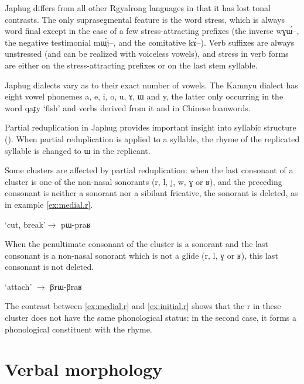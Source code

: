 \documentclass[oldfontcommands,oneside,a4paper,11pt]{article}
\newcommand{\ipa}[1]{{\phon#1}} %
\begin{document}
Japhug differs from all other Rgyalrong languages in that it has lost tonal contrasts. The only suprasegmental feature is the word stress, which is always word final except in the case of a few stress-attracting prefixes (the inverse \ipa{wɣɯ́--}, the negative testimonial \ipa{mɯ́j--}, and the comitative \ipa{kɤ́--}). Verb suffixes are always unstressed (and can be realized with voiceless vowels), and stress in verb forms are either on the stress-attracting prefixes or on the last stem syllable.

Japhug dialects vary as to their exact number of vowels. The Kamnyu dialect has eight vowel phonemes \ipa{a},  \ipa{e},  \ipa{i},  \ipa{o},  \ipa{u},   \ipa{ɤ},  \ipa{ɯ} and \ipa{y}, the latter only occurring in the word \ipa{qaɟy} `fish' and verbs derived from it and in Chinese loanwords. 

Partial reduplication in Japhug provides important insight into syllabic structure (\citealt{jacques07redupl}). When partial reduplication is applied to a syllable, the rhyme of the replicated syllable is changed to \ipa{ɯ} in the replicant.
 
Some clusters are affected by partial reduplication:   when the last consonant  of a cluster is one of the non-nasal sonorants (\ipa{r}, \ipa{l}, \ipa{j}, \ipa{w}, \ipa{ɣ} or \ipa{ʁ}), and the preceding consonant is neither a sonorant nor a sibilant fricative, the sonorant is deleted, as in example \ref{ex:medial.r}. 
 
 \begin{exe}
\ex \label{ex:medial.r}
\glt \ipa{praʁ} `cut, break'$\rightarrow$ \ipa{pɯ-praʁ}
\end{exe}

When the penultimate consonant of the cluster is a sonorant   and the last consonant is a non-nasal sonorant which is not a glide (\ipa{r}, \ipa{l}, \ipa{ɣ} or \ipa{ʁ}), this last consonant  is not deleted. 

 \begin{exe}
\ex  \label{ex:initial.r}
\glt \ipa{βraʁ} `attach' $\rightarrow$ \ipa{βrɯ-βraʁ}
\end{exe}
 
The contrast between \ref{ex:medial.r} and \ref{ex:initial.r} shows that the \ipa{r} in these cluster does not have the same phonological status: in the second case, it forms a phonological constituent with the rhyme.



\section{Verbal morphology}
\end{document}
